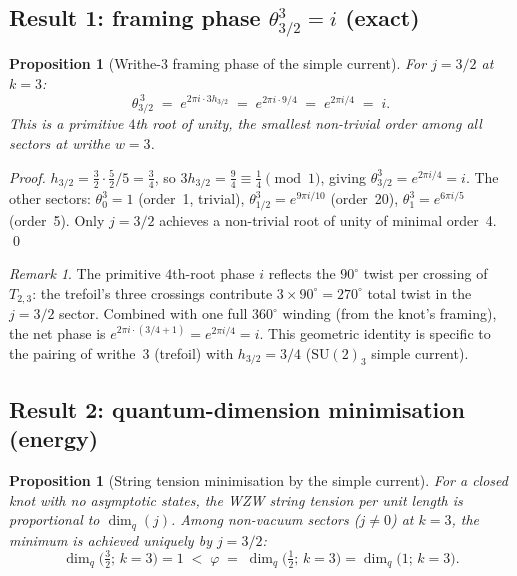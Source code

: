 \documentclass[11pt,a4paper]{article}
\newtheorem{proposition}[theorem]{Proposition}
\theoremstyle{definition}\newtheorem{definition}[theorem]{Definition}
\theoremstyle{remark}
\newtheorem{remark}[theorem]{Remark}
\newcommand{\vp}{\varphi}
\begin{document}
\subsection{Result 1: framing phase $\theta_{3/2}^3 = i$ (exact)}
\label{P15:sec:wrt_phase}

\begin{proposition}[Writhe-3 framing phase of the simple current]
\label{P15:prop:wrt_phase}
For $j=3/2$ at $k=3$:
\begin{equation}
  \theta_{3/2}^{\,3}
  \;=\; e^{2\pi i\cdot 3h_{3/2}}
  \;=\; e^{2\pi i\cdot 9/4}
  \;=\; e^{2\pi i/4}
  \;=\; i.
  \label{P15:eq:theta32_cubed}
\end{equation}
This is a primitive $4$th root of unity, the smallest non-trivial order
among all sectors at writhe $w=3$.
\end{proposition}

\begin{proof}
$h_{3/2} = \tfrac{3}{2}\cdot\tfrac{5}{2}/5 = \tfrac{3}{4}$,
so $3h_{3/2} = \tfrac{9}{4} \equiv \tfrac{1}{4}\pmod{1}$,
giving $\theta_{3/2}^3 = e^{2\pi i/4} = i$.
The other sectors: $\theta_0^3 = 1$ (order~1, trivial),
$\theta_{1/2}^3 = e^{9\pi i/10}$ (order~20),
$\theta_1^3 = e^{6\pi i/5}$ (order~5).
Only $j=3/2$ achieves a non-trivial root of unity of minimal order~4.
\qed
\end{proof}

\begin{remark}
\label{P15:rem:fourth_root_phase}
The primitive $4$th-root phase $i$ reflects the $90^\circ$ twist per
crossing of $T_{2,3}$: the trefoil's three crossings contribute
$3\times 90^\circ = 270^\circ$ total twist in the $j=3/2$ sector.
Combined with one full $360^\circ$ winding (from the knot's framing),
the net phase is $e^{2\pi i\cdot(3/4+1)} = e^{2\pi i/4} = i$.
This geometric identity is specific to the pairing of
writhe~$3$ (trefoil) with $h_{3/2}=3/4$ ($\mathrm{SU}(2)_3$ simple current).
\end{remark}

\subsection{Result 2: quantum-dimension minimisation (energy)}
\label{P15:sec:wrt_dim}

\begin{proposition}[String tension minimisation by the simple current]
\label{P15:prop:wrt_dim}
For a closed knot with no asymptotic states, the WZW string tension
per unit length is proportional to $\dim_q(j)$.
Among non-vacuum sectors ($j\neq 0$) at $k=3$,
the minimum is achieved uniquely by $j=3/2$:
\begin{equation}
  \dim_q\!\bigl(\tfrac{3}{2};\,k{=}3\bigr) = 1
  \;<\; \vp \;=\; \dim_q\!\bigl(\tfrac{1}{2};\,k{=}3\bigr)
        = \dim_q\!\bigl(1;\,k{=}3\bigr).
  \label{P15:eq:dim_min}
\end{equation}
\end{proposition}
\end{document}
